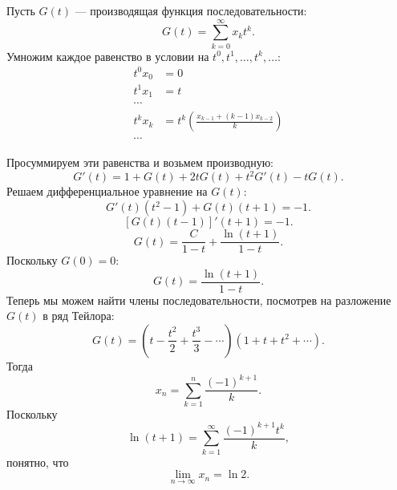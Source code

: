 \documentclass{article}
\begin{document}
Пусть $G(t)$ --- производящая функция последовательности:
$$G(t) = \sum_{k=0}^\infty x_k t^k.$$
Умножим каждое равенство в условии на $t^0, t^1, \ldots, t^k, \ldots$:
\begin{align*}    
t^0 x_0 &= 0\\
t^1 x_1 &= t\\
\cdots&\\
t^k x_k &= t^k \left( \frac{x_{k-1} + (k-1)x_{k-2}}{k} \right)\\
\cdots&
\end{align*}

Просуммируем эти равенства и возьмем производную:
$$G'(t) = 1 + G(t) + 2tG(t) + t^2G'(t) - tG(t).$$
Решаем дифференциальное уравнение на $G(t)$:
$$G'(t)(t^2 - 1) + G(t)(t+1) = -1.$$
$$[G(t)(t-1)]'(t+1) = -1.$$
$$G(t) = \frac{C}{1-t} + \frac{\ln (t+1)}{1-t}.$$
Поскольку $G(0) = 0$:
$$G(t) = \frac{\ln (t+1)}{1-t}.$$
Теперь мы можем найти члены последовательности, посмотрев на разложение $G(t)$ в ряд Тейлора:
$$G(t) = (t - \frac{t^2}{2} + \frac{t^3}{3} - \cdots)(1 + t + t^2 + \cdots).$$
Тогда
$$x_n = \sum_{k=1}^n \frac{(-1)^{k+1}}{k}.$$
Поскольку 
$$\ln(t + 1) = \sum_{k=1}^\infty \frac{(-1)^{k+1}t^k}{k},$$
понятно, что
$$\lim_{n \to \infty} x_n = \ln 2.$$
\end{document}
